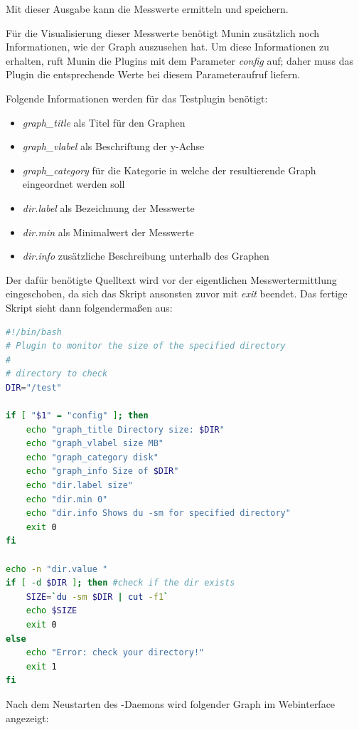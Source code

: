 Mit dieser Ausgabe kann  die Messwerte ermitteln und speichern.

Für die Visualisierung dieser Messwerte benötigt Munin zusätzlich noch Informationen, wie der Graph auszusehen hat.
Um diese Informationen zu erhalten, ruft Munin die Plugins mit dem Parameter \textit{config} auf; daher muss das Plugin die entsprechende Werte bei diesem Parameteraufruf liefern.

Folgende Informationen werden für das Testplugin benötigt:

\begin{itemize}
\item \textit{graph\_title} als Titel für den Graphen
\item \textit{graph\_vlabel} als Beschriftung der y-Achse
\item \textit{graph\_category} für die Kategorie in welche der resultierende Graph eingeordnet werden soll
\item \textit{dir.label} als Bezeichnung der Messwerte
\item \textit{dir.min} als Minimalwert der Messwerte
\item \textit{dir.info} zusätzliche Beschreibung unterhalb des Graphen
\end{itemize}

Der dafür benötigte Quelltext wird vor der eigentlichen Messwertermittlung eingeschoben, da sich das Skript ansonsten zuvor mit \textit{exit} beendet.
Das fertige Skript sieht dann folgendermaßen aus:

\begin{lstlisting}[captionpos=b, caption=Fertiges Skript für den Speicherplatzbedarf eines Verzeichnisses, label=du, breaklines = true, language=bash]
#!/bin/bash
# Plugin to monitor the size of the specified directory
#
# directory to check
DIR="/test"

if [ "$1" = "config" ]; then
	echo "graph_title Directory size: $DIR"
	echo "graph_vlabel size MB"
	echo "graph_category disk"
	echo "graph_info Size of $DIR"
	echo "dir.label size"
	echo "dir.min 0"
	echo "dir.info Shows du -sm for specified directory"
	exit 0
fi

echo -n "dir.value "
if [ -d $DIR ]; then #check if the dir exists
    SIZE=`du -sm $DIR | cut -f1`
    echo $SIZE
    exit 0
else
    echo "Error: check your directory!"
    exit 1
fi
\end{lstlisting}

Nach dem Neustarten des -Daemons wird folgender Graph im Webinterface angezeigt:

